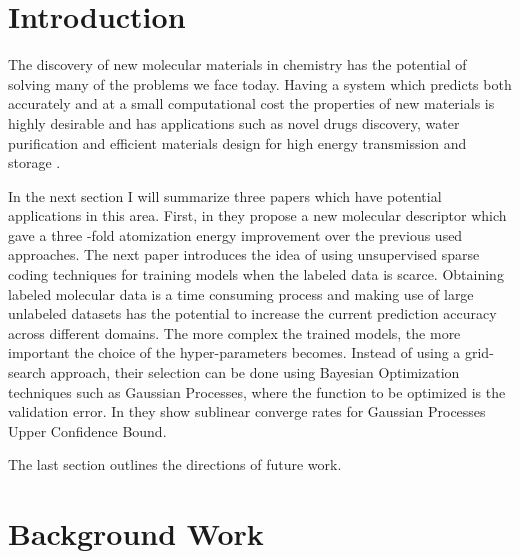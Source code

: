 \documentclass[10pt,journal,a4paper]{IEEEtran}
\begin{document}
\IEEEpeerreviewmaketitle


\section{Introduction}

The discovery of new molecular materials in chemistry has the potential of solving many of the problems we face today.
Having a system which predicts both accurately and at a small computational cost the properties of new materials is highly desirable and has applications such as novel drugs discovery, water purification and efficient materials design for high energy transmission and storage \cite{cleanenergy}. 
 
In the next section I will summarize three papers which have potential applications in this area. First, in \cite{montavon2012learning}
they propose a new molecular descriptor which gave a three -fold  atomization energy improvement over the previous used approaches. The next paper \cite{selftaughtl} introduces the idea of using unsupervised sparse coding techniques for training models when the labeled data is scarce. Obtaining labeled molecular data is a time consuming process and making use of large unlabeled datasets has the potential to increase the current prediction accuracy across different domains. The more complex the trained models, the more important the choice of the hyper-parameters becomes. Instead of using a grid-search approach, their selection can be done using Bayesian Optimization techniques such as Gaussian Processes, where the function to be optimized is the validation error. In \cite{} they show sublinear converge rates for Gaussian Processes Upper Confidence Bound.

The last section outlines the directions of future work.

\section{Background Work}

\end{document}

